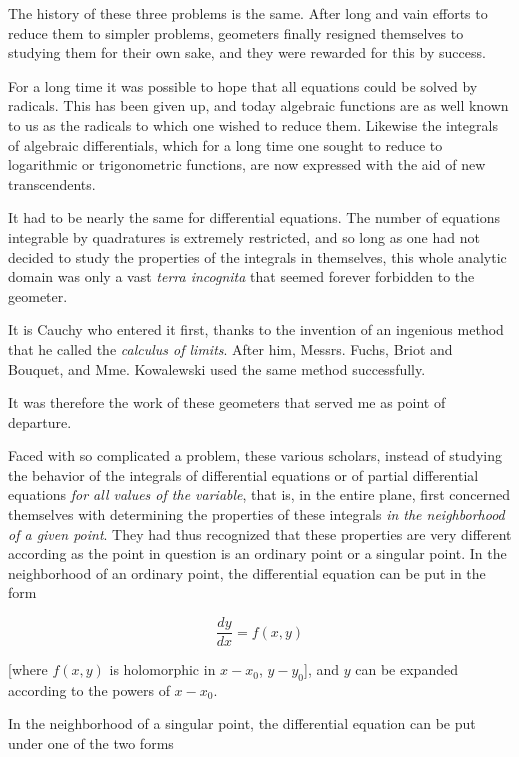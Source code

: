 \documentclass[11pt]{article}
\begin{document}
The history of these three problems is the same. After long and vain efforts to reduce them to simpler problems, geometers finally resigned themselves to studying them for their own sake, and they were rewarded for this by success.

For a long time it was possible to hope that all equations could be solved by radicals. This has been given up, and today algebraic functions are as well known to us as the radicals to which one wished to reduce them. Likewise the integrals of algebraic differentials, which for a long time one sought to reduce to logarithmic or trigonometric functions, are now expressed with the aid of new transcendents.

It had to be nearly the same for differential equations. The number of equations integrable by quadratures is extremely restricted, and so long as one had not decided to study the properties of the integrals in themselves, this whole analytic domain was only a vast \emph{terra incognita} that seemed forever forbidden to the geometer.

It is Cauchy who entered it first, thanks to the invention of an ingenious method that he called the \emph{calculus of limits}. After him, Messrs. Fuchs, Briot and Bouquet, and Mme. Kowalewski used the same method successfully.

It was therefore the work of these geometers that served me as point of departure.

Faced with so complicated a problem, these various scholars, instead of studying the behavior of the integrals of differential equations or of partial differential equations \emph{for all values of the variable}, that is, in the entire plane, first concerned themselves with determining the properties of these integrals \emph{in the neighborhood of a given point}. They had thus recognized that these properties are very different according as the point in question is an ordinary point or a singular point. In the neighborhood of an ordinary point, the differential equation can be put in the form

\begin{equation}
\frac{dy}{dx}=f(x,y)
\end{equation}

[where $f(x,y)$ is holomorphic in $x-x_0$, $y-y_0$], and $y$ can be expanded according to the powers of $x-x_0$.

In the neighborhood of a singular point, the differential equation can be put under one of the two forms
\end{document}
